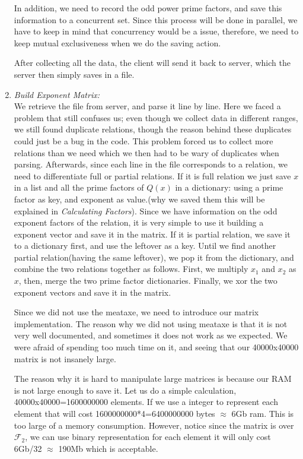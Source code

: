 \documentclass[12pt]{article} %
\newcommand{\itemgap}[1][2]{\vspace{#1mm}}
\begin{document}
\begin{enumerate}
		In addition, we need to record the odd power prime factors, and save this information to a concurrent set. Since this process will be done in parallel, we have to keep in mind that concurrency would be a issue, therefore, we need to keep mutual exclusiveness when we do the saving action. 
		
		After collecting all the data, the client will send it back to server, which the server then simply saves in a file.
		
		\item \textit{Build Exponent Matrix:} \itemgap
		\\ We retrieve the file from server, and parse it line by line. Here we faced a problem that still confuses us; even though we collect data in different ranges, we still found duplicate relations, though the reason behind these duplicates could just be a bug in the code. This problem forced us to collect more relations than we need which we then had to be wary of duplicates when parsing.  
		Afterwards, since each line in the file corresponds to a relation, we need to differentiate full or partial relations. If it is full relation we just save $x$ in a list and all the prime factors of $Q(x)$ in a dictionary: using a prime factor as key, and exponent as value.(why we saved them this will be explained in \textit{Calculating Factors}). Since we have information on the odd exponent factors of the relation, it is very simple to use it building a exponent vector and save it in the matrix. If it is partial relation, we save it to a dictionary first, and use the leftover as a key. Until we find another partial relation(having the same leftover), we pop it from the dictionary, and combine the two relations together as follows. First, we multiply $x_1$ and $x_2$ as $x$, then, merge the two prime factor dictionaries. Finally, we xor the two exponent vectors and save it in the matrix.
		
		Since we did not use the meataxe, we need to introduce our matrix implementation. The reason why we did not using meataxe is that it is not very well documented, and sometimes it does not work as we expected. We were afraid of spending too much time on it, and seeing that our 40000x40000 matrix is not insanely large. 
		
		The reason why it is hard to manipulate large matrices is because our RAM is not large enough to save it. Let us do a simple calculation, 40000x40000=1600000000 elements. If we use a integer to represent each element that will cost 1600000000*4=6400000000 bytes $\approx$ 6Gb ram. This is too large of a memory consumption. However, notice since the matrix is over $\mathcal{F}_2$, we can use binary representation for each element it will only cost 6Gb/32 $\approx$ 190Mb which is acceptable. 
		

\end{enumerate}
\end{document}
